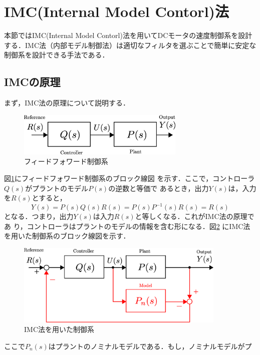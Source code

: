 \documentclass[a4paper,12pt]{jarticle}
\begin{document}
\newpage

\section{IMC(Internal Model Contorl)法}
本節ではIMC(Internal Model Contorl)法を用いてDCモータの速度制御系を設計
する．IMC法（内部モデル制御法）は適切なフィルタを選ぶことで簡単に安定な
制御系を設計できる手法である．
\subsection{IMCの原理}
まず，IMC法の原理について説明する．
%
\begin{figure}[bp]
 \begin{center}
  \includegraphics[width = 80mm]{fig/FF.eps}
 \end{center}
 \caption{フィードフォワード制御系}
 \label{fig:ff}
\end{figure}
%
図\ref{fig:ff}にフィードフォワード制御系のブロック線図
を示す．ここで，コントローラ$Q(s)$がプラントのモデル$P(s)$の逆数と等価で
あるとき，出力$Y(s)$は，入力を$R(s)$とすると，
\begin{equation}
Y(s) = P(s)Q(s)R(s) = P(s)P^{-1}(s)R(s) =R(s)
\end{equation}
となる．つまり，出力$Y(s)$は入力$R(s)$と等しくなる．これがIMC法の原理であ
り，コントローラはプラントのモデルの情報を含む形になる．図\ref{fig:IMC}
にIMC法を用いた制御系のブロック線図を示す．
%
\begin{figure}[tbp]
 \begin{center}
  \includegraphics[width = 100mm]{fig/IMC.eps}
 \end{center}
 \caption{IMC法を用いた制御系}
 \label{fig:IMC}
\end{figure}
%
ここで$P_n(s)$はプラントのノミナルモデルである．もし，ノミナルモデルがプ
\end{document}

